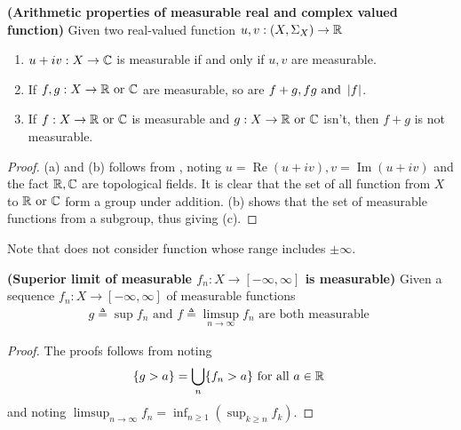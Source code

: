 \documentclass{report}
\begin{document}
\begin{theorem}
\label{Btsa}
\textbf{(Arithmetic properties of measurable real and complex valued function)} Given two real-valued function $u,v:(X,\Sigma_X)\rightarrow \mathbb{R}$
\begin{enumerate}[label=(\alph*)]
  \item  $u+iv:X\rightarrow \mathbb{C}$ is measurable if and only if $u,v$ are measurable.
  \item If  $f,g:X\rightarrow \mathbb{R}\text{ or }\mathbb{C}$ are measurable, so are $f+g,fg\text{ and }\left|f\right|$.
  \item If $f:X\rightarrow \mathbb{R}\text{ or }\mathbb{C}$ is measurable and $g:X\rightarrow \mathbb{R}\text{ or }\mathbb{C}$ isn't, then $f+g$ is not measurable.
\end{enumerate}
\end{theorem}
\begin{proof}
(a) and (b) follows from , noting $u=\operatorname{Re}(u+iv),v=\operatorname{Im}(u+iv)$ and the fact $\mathbb{R},\mathbb{C}$ are topological fields. It is clear that the set of all function from  $X$ to $\mathbb{R}\text{ or }\mathbb{C}$ form a group under addition. (b) shows that the set of measurable functions from a subgroup, thus giving (c).
\end{proof}
\begin{mdframed}
Note that  does not consider function whose range includes $\pm \infty$. 
\end{mdframed}
\begin{theorem}
\label{Slm}
\textbf{(Superior limit of measurable $f_n:X\rightarrow [-\infty,\infty]$ is measurable)} Given a sequence $f_n:X\rightarrow [-\infty, \infty]$ of measurable functions
\begin{align*}
g\triangleq \sup f_n \text{ and }f\triangleq \limsup_{n\to\infty} f_n\text{ are both measurable }
\end{align*}
\end{theorem}
\begin{proof}
The proofs follows from noting 
\begin{align*}
\{ g>a \}=\bigcup_n \{ f_n>a \}\text{ for all $a\in\mathbb{R}$ }
\end{align*}
and noting $\limsup_{n\to\infty} f_n= \inf_{n\geq 1} (\sup_{k\geq n} f_k)$. 
\end{proof}
\end{document}
